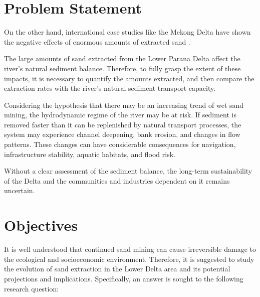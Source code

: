 \section{Problem Statement}

On the other hand, international case studies like the Mekong Delta have shown the negative effects of enormous amounts of extracted sand \autocite{brunierRecentMorphologicalChanges2014}. 


The large amounts of sand extracted from the Lower Parana Delta affect the river's natural sediment balance. Therefore, to fully grasp the extent of these impacts, it is necessary to quantify the amounts extracted, and then compare the extraction rates with the river’s natural sediment transport capacity.

Considering the hypothesis that there may be an increasing trend of wet sand mining, the hydrodynamic regime of the river may be at risk. If sediment is removed faster than it can be replenished by natural transport processes, the system may experience channel deepening, bank erosion, and changes in flow patterns. These changes can have considerable consequences for navigation, infrastructure stability, aquatic habitats, and flood risk. 

Without a clear assessment of the sediment balance, the long-term sustainability of the Delta and the communities and industries dependent on it remains uncertain.

\section{Objectives}


It is well understood that continued sand mining can cause irreversible damage to the ecological and socioeconomic environment. Therefore, it is suggested to study the evolution of sand extraction in the Lower Delta area and its potential projections and implications. Specifically, an answer is sought to the following research question:

